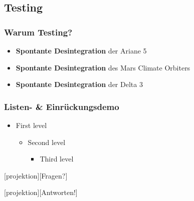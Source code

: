 \documentclass[t]{beamer}
\begin{document}
\subsection{Testing}

\begin{frame}
  \frametitle{Warum Testing?}
  \begin{itemize}
    \item \textbf{Spontante Desintegration} der Ariane 5
    \item \textbf{Spontante Desintegration} des Mars Climate Orbiters
    \item \textbf{Spontante Desintegration} der Delta 3
  \end{itemize}
\end{frame}

\begin{frame}
  \frametitle{Listen- \& Einrückungsdemo}
  \begin{itemize}
    \item First level
    \begin{itemize}
      \item Second level
      \begin{itemize}
        \item Third level
      \end{itemize}
    \end{itemize}
  \end{itemize}
\end{frame}

[projektion][Fragen?]
\begin{frame}
\end{frame}

[projektion][Antworten!]
\begin{frame}
\end{frame}
\end{document}
